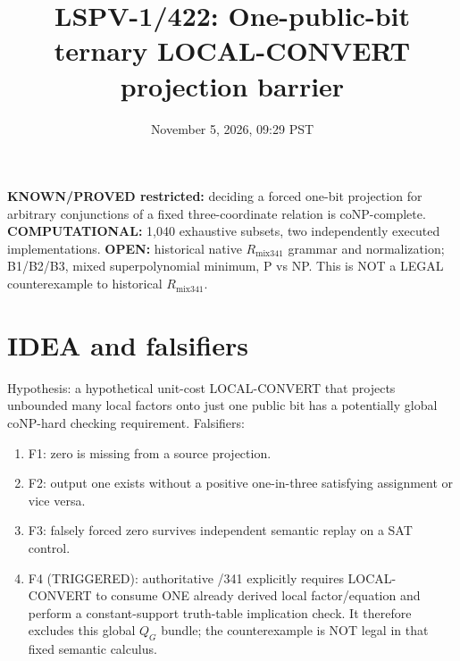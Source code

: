 \documentclass[11pt]{article}
\title{LSPV-1/422: One-public-bit ternary LOCAL-CONVERT projection barrier}
\date{November 5, 2026, 09:29 PST}
\begin{document}
\maketitle
\noindent\textbf{KNOWN/PROVED restricted:} deciding a forced one-bit projection for arbitrary conjunctions of a fixed three-coordinate relation is coNP-complete. \textbf{COMPUTATIONAL:} 1,040 exhaustive subsets, two independently executed implementations. \textbf{OPEN:} historical native $R_{\mathrm{mix341}}$ grammar and normalization; B1/B2/B3, mixed superpolynomial minimum, P vs NP. This is NOT a LEGAL counterexample to historical $R_{\mathrm{mix341}}$.
\section*{IDEA and falsifiers}
\noindent Hypothesis: a hypothetical unit-cost LOCAL-CONVERT that projects unbounded many local factors onto just one public bit has a potentially global coNP-hard checking requirement. Falsifiers:
\begin{enumerate}
\item[] F1: zero is missing from a source projection.
\item[] F2: output one exists without a positive one-in-three satisfying assignment or vice versa.
\item[] F3: falsely forced zero survives independent semantic replay on a SAT control.
\item[] F4 (TRIGGERED): authoritative /341 explicitly requires LOCAL-CONVERT to consume ONE already derived local factor/equation and perform a constant-support truth-table implication check. It therefore excludes this global $Q_G$ bundle; the counterexample is NOT legal in that fixed semantic calculus.
\end{enumerate}
\end{document}
